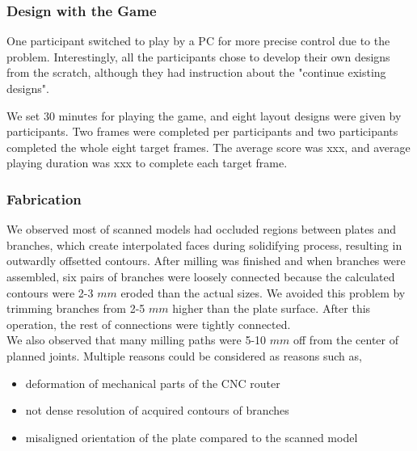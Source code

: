 \subsubsection*{Design with the Game}
One participant switched to play by a PC for more precise control due to the problem.
Interestingly, all the participants chose to develop their own designs from the scratch, although they had instruction about the "continue existing designs".

We set 30 minutes for playing the game, and eight layout designs were given by participants.
Two frames were completed per participants and two participants completed the whole eight target frames.
The average score was xxx, and average playing duration was xxx to complete each target frame. 


\subsubsection*{Fabrication}

We observed most of scanned models had occluded regions between plates and branches, which create interpolated faces during solidifying process, resulting in outwardly offsetted contours.  After milling was finished and when branches were assembled, six pairs of branches were loosely connected because the calculated contours were 2-3 $mm$ eroded than the actual sizes.
We avoided this problem by trimming branches from 2-5 $mm$ higher than the plate surface.
After this operation, the rest of connections were tightly connected. \\

We also observed that many milling paths were 5-10 $mm$ off from the center of planned joints.
Multiple reasons could be considered as reasons such as,

\begin{itemize}
  \item{deformation of mechanical parts of the CNC router}
  \item{not dense resolution of acquired contours of branches}
  \item{misaligned orientation of the plate compared to the scanned model}
\end{itemize}

